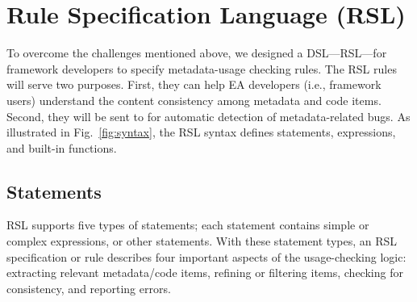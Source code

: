 \vspace{-.5em}
\section{Rule Specification Language (RSL)}\label{se:rsl}

To overcome the challenges mentioned above, we designed a DSL---RSL---for framework developers to specify metadata-usage checking rules. The RSL rules will serve two purposes. First, they can help EA developers (i.e., framework users)  understand the content consistency among metadata and code items. Second, they will be sent to \tool for automatic detection of metadata-related bugs. 
As illustrated in Fig.~\ref{fig:syntax}, the RSL syntax defines statements, expressions, and built-in functions.

\vspace{-0.5em}
\subsection{Statements}
RSL supports five types of statements;  
each statement contains simple or complex expressions, or other statements. 
With these statement types, an RSL specification or rule describes four important aspects of the usage-checking logic:
extracting relevant metadata/code items, refining or filtering items, checking for consistency, and reporting errors.

